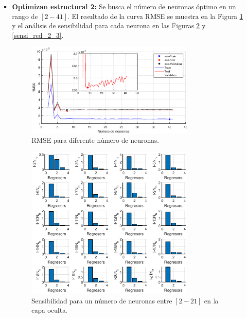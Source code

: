 \documentclass[12pt]{article}
\begin{document}
\begin{itemize}
	\newpage
	\item \textbf{Optimizan estructural 2:} Se busca el número de neuronas óptimo en un rango de $[2-41]$. El resultado de la curva RMSE se muestra en la Figura \ref{rmse_3} y el análisis de sensibilidad para cada neurona en las Figuras \ref{sensi_red_1_3} y \ref{sensi_red_2_3}.

	\begin{figure}[h!]
		\centering
		\includegraphics[width=0.8\textwidth]{imag/redes/RMSE_full.eps}
		\caption{RMSE para diferente número de neuronas.}
		\label{rmse_3}
	\end{figure}
	\newpage
	\clearpage
	\begin{figure}[t!]
		\centering
		\includegraphics[width=0.8\textwidth]{imag/redes/sensibilidad_full_1_3.eps}
		\caption{Sensibilidad para un número de neuronas entre $[2-21]$ en la capa oculta.}
		\label{sensi_red_1_3}

\end{figure}
\end{itemize}
\end{document}

